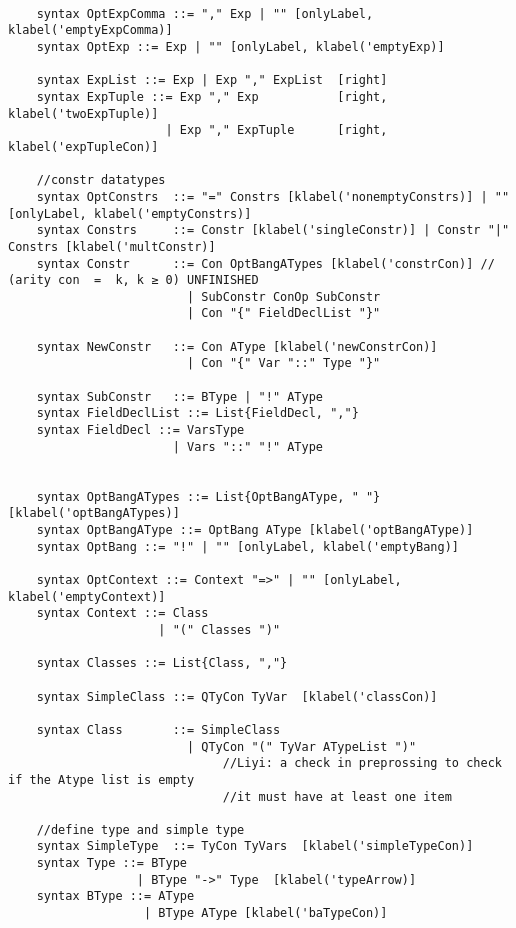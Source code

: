 \begin{lstlisting}

    syntax OptExpComma ::= "," Exp | "" [onlyLabel, klabel('emptyExpComma)]
    syntax OptExp ::= Exp | "" [onlyLabel, klabel('emptyExp)]

    syntax ExpList ::= Exp | Exp "," ExpList  [right]
    syntax ExpTuple ::= Exp "," Exp           [right, klabel('twoExpTuple)]
                      | Exp "," ExpTuple      [right, klabel('expTupleCon)]

    //constr datatypes
    syntax OptConstrs  ::= "=" Constrs [klabel('nonemptyConstrs)] | "" [onlyLabel, klabel('emptyConstrs)]
    syntax Constrs     ::= Constr [klabel('singleConstr)] | Constr "|" Constrs [klabel('multConstr)]
    syntax Constr      ::= Con OptBangATypes [klabel('constrCon)] // (arity con  =  k, k ≥ 0) UNFINISHED
                         | SubConstr ConOp SubConstr
                         | Con "{" FieldDeclList "}"

    syntax NewConstr   ::= Con AType [klabel('newConstrCon)]
                         | Con "{" Var "::" Type "}"

    syntax SubConstr   ::= BType | "!" AType
    syntax FieldDeclList ::= List{FieldDecl, ","}
    syntax FieldDecl ::= VarsType
                       | Vars "::" "!" AType


    syntax OptBangATypes ::= List{OptBangAType, " "} [klabel('optBangATypes)]
    syntax OptBangAType ::= OptBang AType [klabel('optBangAType)]
    syntax OptBang ::= "!" | "" [onlyLabel, klabel('emptyBang)]

    syntax OptContext ::= Context "=>" | "" [onlyLabel, klabel('emptyContext)]
    syntax Context ::= Class
                     | "(" Classes ")"

    syntax Classes ::= List{Class, ","}

    syntax SimpleClass ::= QTyCon TyVar  [klabel('classCon)]

    syntax Class       ::= SimpleClass
                         | QTyCon "(" TyVar ATypeList ")"
                              //Liyi: a check in preprossing to check if the Atype list is empty
                              //it must have at least one item

    //define type and simple type
    syntax SimpleType  ::= TyCon TyVars  [klabel('simpleTypeCon)]
    syntax Type ::= BType
                  | BType "->" Type  [klabel('typeArrow)]
    syntax BType ::= AType
                   | BType AType [klabel('baTypeCon)]


\end{lstlisting}
